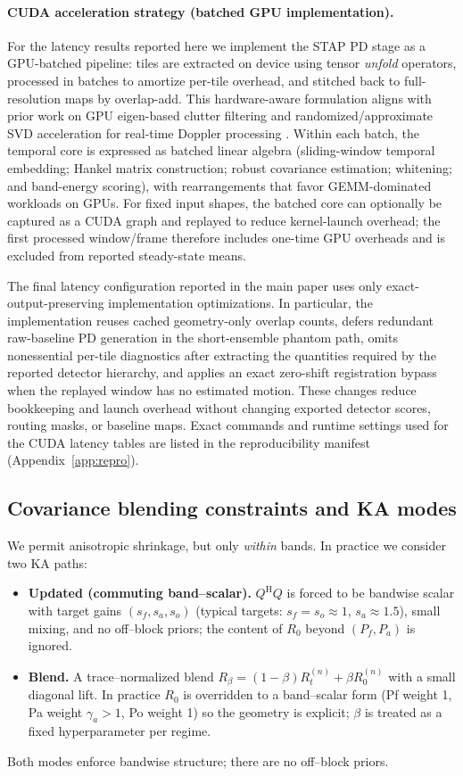 \documentclass[11pt]{article}
\newcommand{\Hh}{^{\mathrm{H}}}
\newcommand{\Pf}{P_f}
\newcommand{\Pa}{P_a}
\newif\ifSTAPPAPERONLY
\newcommand{\SuppOrApp}[1]{\ifSTAPPAPERONLY Supplementary Material\else Appendix~\ref{#1}\fi}
\begin{document}
\paragraph{CUDA acceleration strategy (batched GPU implementation).}
For the latency results reported here we implement the STAP PD stage as a GPU-batched pipeline: tiles are extracted on device using tensor \emph{unfold} operators, processed in batches to amortize per-tile overhead, and stitched back to full-resolution maps by overlap-add. This hardware-aware formulation aligns with prior work on GPU eigen-based clutter filtering and randomized/approximate SVD acceleration for real-time Doppler processing \cite{CheeGPUEigen2017,LokRandomizedSVD2020}. Within each batch, the temporal core is expressed as batched linear algebra (sliding-window temporal embedding; Hankel matrix construction; robust covariance estimation; whitening; and band-energy scoring), with rearrangements that favor GEMM-dominated workloads on GPUs. For fixed input shapes, the batched core can optionally be captured as a CUDA graph and replayed to reduce kernel-launch overhead; the first processed window/frame therefore includes one-time GPU overheads and is excluded from reported steady-state means.

\noindent The final latency configuration reported in the main paper uses only exact-output-preserving implementation optimizations. In particular, the implementation reuses cached geometry-only overlap counts, defers redundant raw-baseline PD generation in the short-ensemble phantom path, omits nonessential per-tile diagnostics after extracting the quantities required by the reported detector hierarchy, and applies an exact zero-shift registration bypass when the replayed window has no estimated motion. These changes reduce bookkeeping and launch overhead without changing exported detector scores, routing masks, or baseline maps. Exact commands and runtime settings used for the CUDA latency tables are listed in the reproducibility manifest (\SuppOrApp{app:repro}).

\subsection{Covariance blending constraints and KA modes}

We permit anisotropic shrinkage, but only \emph{within} bands. In practice we consider two KA paths:
\begin{itemize}[nosep]
  \item \textbf{Updated (commuting band--scalar).} $Q\Hh Q$ is forced to be bandwise scalar with target gains $(s_f,s_a,s_o)$ (typical targets: $s_f=s_o\approx 1$, $s_a\approx 1.5$), small mixing, and no off--block priors; the content of $R_0$ beyond $(\Pf,\Pa)$ is ignored.
  \item \textbf{Blend.} A trace--normalized blend $R_\beta = (1-\beta) R_t^{(n)} + \beta R_0^{(n)}$ with a small diagonal lift. In practice $R_0$ is overridden to a band--scalar form (Pf weight 1, Pa weight $\gamma_a>1$, Po weight 1) so the geometry is explicit; $\beta$ is treated as a fixed hyperparameter per regime.
\end{itemize}
Both modes enforce bandwise structure; there are no off--block priors.
\end{document}
